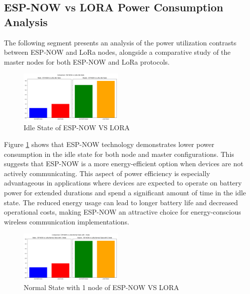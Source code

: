 
\subsection{ESP-NOW vs LORA Power Consumption Analysis}\label{sec:power_consumption_analysis}
The following segment presents an analysis of the power utilization contrasts between ESP-NOW and LoRa nodes, alongside a comparative study of the master nodes for both ESP-NOW and LoRa protocols.

\begin{figure}[H]
  \begin{center}
    \includegraphics[width=0.45\textwidth]{./Figures/Average_Power_Consumption/ESP-NOW_vs_LORA_Idle.png}
  \end{center}
  \caption{Idle State of ESP-NOW VS LORA}\label{fig:esp_lora_idle}
\end{figure}

Figure \ref{fig:esp_lora_idle} shows that ESP-NOW technology demonstrates lower power consumption in the idle state for both node and master configurations. This suggests that ESP-NOW is a more energy-efficient option when devices are not actively communicating. This aspect of power efficiency is especially advantageous in applications where devices are expected to operate on battery power for extended durations and spend a significant amount of time in the idle state. The reduced energy usage can lead to longer battery life and decreased operational costs, making ESP-NOW an attractive choice for energy-conscious wireless communication implementations.

\begin{figure}[H]
  \begin{center}
    \includegraphics[width=0.45\textwidth]{./Figures/Average_Power_Consumption/ESP-NOW_vs_LORA_Normal_1_node.png}
  \end{center}
  \caption{Normal State with 1 node of ESP-NOW VS LORA}\label{fig:esp_lora_1}
\end{figure}

